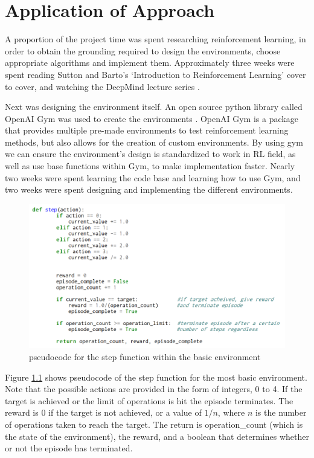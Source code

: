 \chapter{Application of Approach}

A proportion of the project time was spent researching reinforcement learning, in order to obtain the grounding required to design the environments, choose appropriate algorithms and implement them. Approximately three weeks were spent reading Sutton and Barto's `Introduction to Reinforcement Learning'\cite{Sutton:RLIntro01} cover to cover, and watching the DeepMind lecture series \cite{silver}. 

Next was designing the environment itself. An open source python library called OpenAI Gym was used to create the environments \cite{AIgym}. OpenAI Gym is a package that provides multiple pre-made environments to test reinforcement learning methods, but also allows for the creation of custom environments. By using gym we can ensure the environment's design is standardized to work in RL field, as well as use base functions within Gym, to make implementation faster. Nearly two weeks were spent learning the code base and learning how to use Gym, and two weeks were spent designing and implementing the different environments.

\begin{figure}[h]
\includegraphics[width=\textwidth]{images/pseudo}
\caption[basic environment pseudocode]{pseudocode for the step function within the basic environment}
\label{fig:basicenv}
\end{figure}

Figure \ref{fig:basicenv} shows pseudocode of the step function for the most basic environment. Note that the possible actions are provided in the form of integers, 0 to 4. If the target is achieved or the limit of operations is hit the episode terminates. The reward is 0 if the target is not achieved, or a value of $1/n$, where $n$ is the number of operations taken to reach the target. The return is operation\_count (which is the state of the environment), the reward, and a boolean that determines whether or not the episode has terminated. 


